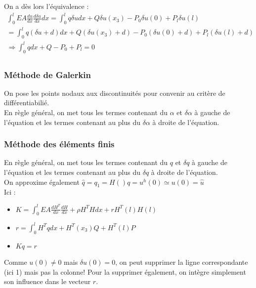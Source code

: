 \documentclass[../main.tex]{subfiles}
\begin{document}
On a dès lors l'équivalence : \begin{equation}
    \begin{gathered}
        \int_0^l EA \frac{du}{dx} \frac{d\delta u}{dx}dx = \int_0^l q \delta u dx + Q \delta u(x_3) - P_0 \delta u(0) + P_l \delta u(l)\\
        = \int_0^l q(\delta u + d) dx + Q(\delta u(x_3) + d) - P_0(\delta u(0) + d) + P_l(\delta u(l) + d) \\
        \Rightarrow \int_0^l qdx + Q - P_0 + P_l = 0\\
    \end{gathered}
\end{equation}

\subsubsection{Méthode de Galerkin}
On pose les points nodaux aux discontinuités pour convenir au critère de différentiabilié.\\

En règle général, on met tous les termes contenant du $\alpha$ et $\delta \alpha$ à gauche de l'équation et les termes contenant au plus du $\delta \alpha$ à droite de l'équation.\\

\subsubsection{Méthode des éléments finis}
En règle général, on met tous les termes contenant du $q$ et $\delta q$ à gauche de l'équation et les termes contenant au plus du $\delta q$ à droite de l'équation.\\
On approxime également $\hat{q} = q_1 = H()q = u^h(0) \simeq u(0) = \hat{u}$\\

Ici : \begin{itemize}
    \item $K = \int_0^l EA \frac{dH^T}{dx} \frac{dH}{dx} + \rho H^T H dx + r H^T(l) H(l)$\\
    \item $r = \int_0^l H^T qdx + H^T(x_3) Q + H^T(l)P$\\
    \item $Kq = r$\\
\end{itemize}

\warning Comme $u(0) \neq 0$ mais $\delta u(0) = 0$, on peut supprimer la ligne correspondante (ici 1) mais pas la colonne! Pour la supprimer également, on intègre simplement son influence dans le vecteur $r$.\\
\end{document}
